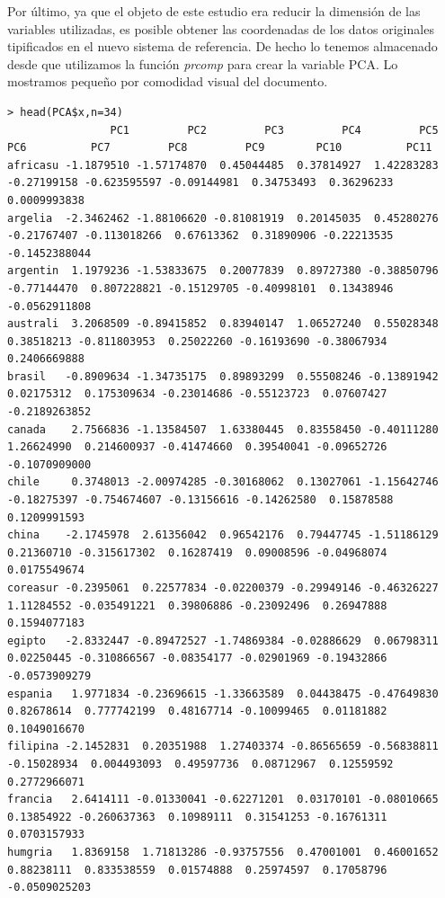 \documentclass[12pt,twoside]{report}
\begin{document}
Por último, ya que el objeto de este estudio era reducir la dimensión de las variables utilizadas, es posible obtener las coordenadas de los datos originales tipificados en el nuevo sistema de referencia. De hecho lo tenemos almacenado desde que utilizamos la función \textit{prcomp} para crear la variable PCA. Lo mostramos pequeño por comodidad visual del documento.

\tiny \begin{verbatim}
> head(PCA$x,n=34)
                PC1         PC2         PC3         PC4         PC5         PC6          PC7         PC8         PC9        PC10          PC11
africasu -1.1879510 -1.57174870  0.45044485  0.37814927  1.42283283 -0.27199158 -0.623595597 -0.09144981  0.34753493  0.36296233  0.0009993838
argelia  -2.3462462 -1.88106620 -0.81081919  0.20145035  0.45280276 -0.21767407 -0.113018266  0.67613362  0.31890906 -0.22213535 -0.1452388044
argentin  1.1979236 -1.53833675  0.20077839  0.89727380 -0.38850796 -0.77144470  0.807228821 -0.15129705 -0.40998101  0.13438946 -0.0562911808
australi  3.2068509 -0.89415852  0.83940147  1.06527240  0.55028348  0.38518213 -0.811803953  0.25022260 -0.16193690 -0.38067934  0.2406669888
brasil   -0.8909634 -1.34735175  0.89893299  0.55508246 -0.13891942  0.02175312  0.175309634 -0.23014686 -0.55123723  0.07607427 -0.2189263852
canada    2.7566836 -1.13584507  1.63380445  0.83558450 -0.40111280  1.26624990  0.214600937 -0.41474660  0.39540041 -0.09652726 -0.1070909000
chile     0.3748013 -2.00974285 -0.30168062  0.13027061 -1.15642746 -0.18275397 -0.754674607 -0.13156616 -0.14262580  0.15878588  0.1209991593
china    -2.1745978  2.61356042  0.96542176  0.79447745 -1.51186129  0.21360710 -0.315617302  0.16287419  0.09008596 -0.04968074  0.0175549674
coreasur -0.2395061  0.22577834 -0.02200379 -0.29949146 -0.46326227  1.11284552 -0.035491221  0.39806886 -0.23092496  0.26947888  0.1594077183
egipto   -2.8332447 -0.89472527 -1.74869384 -0.02886629  0.06798311  0.02250445 -0.310866567 -0.08354177 -0.02901969 -0.19432866 -0.0573909279
espania   1.9771834 -0.23696615 -1.33663589  0.04438475 -0.47649830  0.82678614  0.777742199  0.48167714 -0.10099465  0.01181882  0.1049016670
filipina -2.1452831  0.20351988  1.27403374 -0.86565659 -0.56838811 -0.15028934  0.004493093  0.49597736  0.08712967  0.12559592  0.2772966071
francia   2.6414111 -0.01330041 -0.62271201  0.03170101 -0.08010665  0.13854922 -0.260637363  0.10989111  0.31541253 -0.16761311  0.0703157933
humgria   1.8369158  1.71813286 -0.93757556  0.47001001  0.46001652  0.88238111  0.833538559  0.01574888  0.25974597  0.17058796 -0.0509025203

\end{verbatim}
\end{document}
